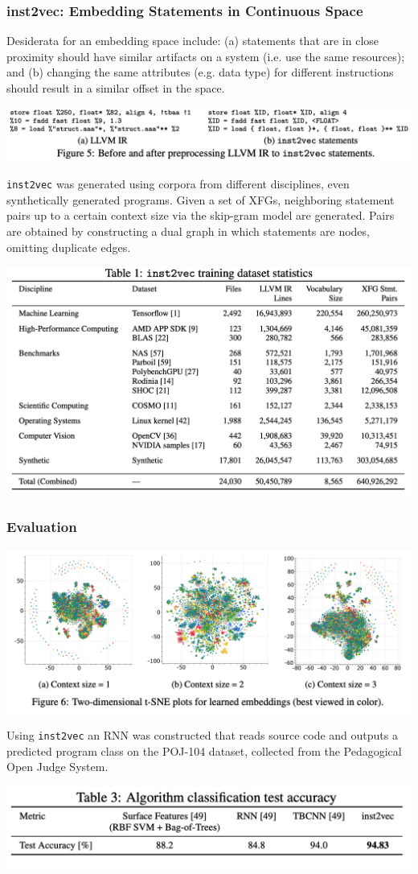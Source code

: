 \documentclass{article}
\begin{document}
\subsubsection{inst2vec: Embedding Statements in Continuous Space}
Desiderata for an embedding space include: (a) statements that are in close proximity should have similar artifacts on a system (i.e. use the same resources); and (b) changing the same attributes (e.g. data type) for different instructions should result in a similar offset in the space.
\centerline{\includegraphics[width=\columnwidth]{Images/Similarity4-3.png}}
\texttt{inst2vec} was generated using corpora from different disciplines, even synthetically generated programs. Given a set of XFGs, neighboring statement pairs up to a certain context size via the skip-gram model are generated.
Pairs are obtained by constructing a dual graph in which statements are nodes, omitting duplicate edges.
\centerline{\includegraphics[width=\columnwidth]{Images/Similarity4-4.png}}
\subsubsection{Evaluation}
\centerline{\includegraphics[width=\columnwidth]{Images/Similarity4-5.png}}
Using \texttt{inst2vec} an RNN was constructed that reads source code and outputs a predicted program class on the POJ-104 dataset, collected from the Pedagogical Open Judge System.
\centerline{\includegraphics[width=\columnwidth]{Images/Similarity4-6.png}}
\end{document}

